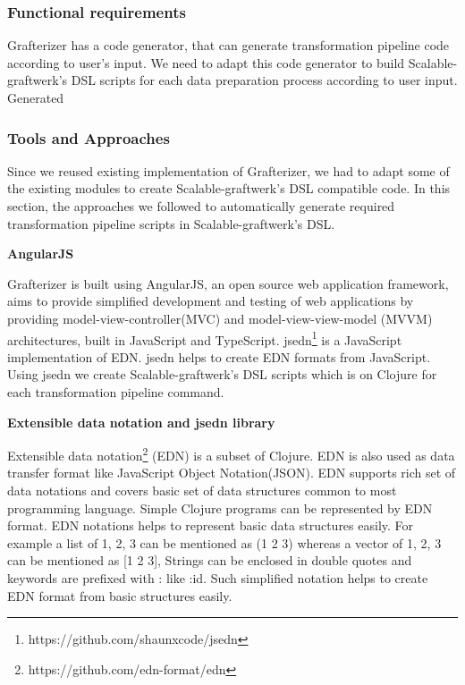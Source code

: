 \subsubsection{Functional requirements}
Grafterizer has a code generator, that can generate transformation pipeline code according to user's input. We need to adapt this code generator to build Scalable-graftwerk's DSL scripts for each data preparation process according to user input. Generated 

\subsubsection{Tools and Approaches}
Since we reused existing implementation of Grafterizer, we had to adapt some of the existing modules to create Scalable-graftwerk's DSL compatible code. In this section, the approaches we followed to automatically generate required transformation pipeline scripts in Scalable-graftwerk's DSL. 

\textbf{AngularJS}

Grafterizer is built using AngularJS, an open source web application framework, aims to provide simplified development and testing of web applications by providing model-view-controller(MVC) and model-view-view-model (MVVM) architectures, built in JavaScript and TypeScript. jsedn\footnote{https://github.com/shaunxcode/jsedn} is a JavaScript implementation of EDN. jsedn helps to create EDN formats from JavaScript. Using jsedn we create Scalable-graftwerk's DSL scripts which is on Clojure for each transformation pipeline command. 

\textbf{Extensible data notation and jsedn library}

Extensible data notation\footnote{https://github.com/edn-format/edn} (EDN) is a subset of Clojure. EDN is also used as data transfer format like JavaScript Object Notation(JSON). EDN supports rich set of data notations and covers basic set of data structures common to most programming language. Simple Clojure programs can be represented by EDN format. EDN notations helps to represent basic data structures easily. For example a list of 1, 2, 3 can be mentioned as (1 2 3) whereas a vector of 1, 2, 3 can be mentioned as [1 2 3], Strings can be enclosed in double quotes and keywords are prefixed with : like :id. Such simplified notation helps to create EDN format from basic structures easily. 

